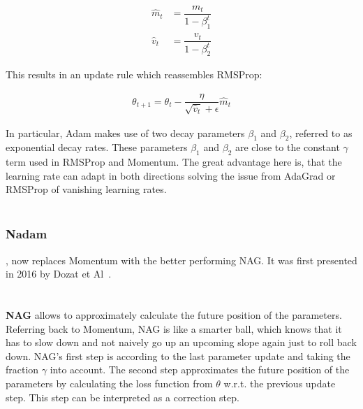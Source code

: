 \begin{align}
\hat{m}_t &= \dfrac{m_t}{1 - \beta^t_1} \label{eqn:adam:3}\\
\hat{v}_t &= \dfrac{v_t}{1 - \beta^t_2} \label{eqn:adam:4}
\end{align}

This results in an update rule which reassembles \gls{RMSProp}:

\begin{align}
    \theta_{t+1} = \theta_{t} - \dfrac{\eta}{\sqrt{\hat{v}_t} + \epsilon} \hat{m}_t \label{eqn:adam:5}
\end{align}

%

In particular, \gls{Adam} makes use of two decay parameters $\beta_1$ and $\beta_2$, referred to as exponential decay rates.
These parameters $\beta_1$ and $\beta_2$ are close to the constant $\gamma$ term used in \gls{RMSProp} and Momentum.
The great advantage here is, that the learning rate can adapt in both directions solving the issue from \gls{AdaGrad} or
\gls{RMSProp} of vanishing learning rates.
\\\mbox{}\\
\subsubsection{\gls{Nadam}},
now replaces Momentum with the better performing \gls{NAG}.
It was first presented in 2016 by Dozat et Al~\cite{nadam}.\\
\\\mbox{}\\
\textbf{\gls{NAG}} allows to approximately calculate the future position of the parameters.
Referring back to Momentum, \gls{NAG} is like a smarter ball, which knows that it has to slow down and not naively go up an upcoming
slope again just to roll back down.
\gls{NAG}'s first step is according to the last parameter update and taking the fraction $\gamma$ into account.
The second step approximates the future position of the parameters by calculating the loss function from $\theta$ w.r.t.
the previous update step.
This step can be interpreted as a correction step.

